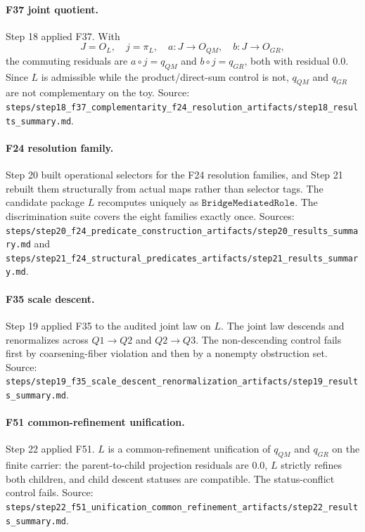 \paragraph{F37 joint quotient.}
Step 18 applied F37.  With
\[
J=O_L,\quad j=\pi_L,\quad a:J\to O_{QM},\quad b:J\to O_{GR},
\]
the commuting residuals are \(a\circ j=q_{QM}\) and \(b\circ j=q_{GR}\), both
with residual \(0.0\).  Since \(L\) is admissible while the product/direct-sum
control is not, \(q_{QM}\) and \(q_{GR}\) are not complementary on the toy.
Source:
\texttt{steps/step18\_f37\_complementarity\_f24\_resolution\_artifacts/step18\_results\_summary.md}.

\paragraph{F24 resolution family.}
Step 20 built operational selectors for the F24 resolution families, and
Step 21 rebuilt them structurally from actual maps rather than selector tags.
The candidate package \(L\) recomputes uniquely as
\(\texttt{BridgeMediatedRole}\).  The discrimination suite covers the eight
families exactly once.  Sources:
\texttt{steps/step20\_f24\_predicate\_construction\_artifacts/step20\_results\_summary.md}
and
\texttt{steps/step21\_f24\_structural\_predicates\_artifacts/step21\_results\_summary.md}.

\paragraph{F35 scale descent.}
Step 19 applied F35 to the audited joint law on \(L\).  The joint law descends
and renormalizes across \(Q1\to Q2\) and \(Q2\to Q3\).  The non-descending
control fails first by coarsening-fiber violation and then by a nonempty
obstruction set.  Source:
\texttt{steps/step19\_f35\_scale\_descent\_renormalization\_artifacts/step19\_results\_summary.md}.

\paragraph{F51 common-refinement unification.}
Step 22 applied F51.  \(L\) is a common-refinement unification of \(q_{QM}\)
and \(q_{GR}\) on the finite carrier: the parent-to-child projection residuals
are \(0.0\), \(L\) strictly refines both children, and child descent statuses
are compatible.  The status-conflict control fails.  Source:
\texttt{steps/step22\_f51\_unification\_common\_refinement\_artifacts/step22\_results\_summary.md}.

